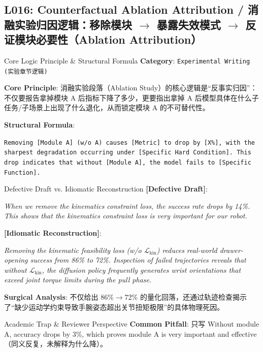 \subsection{L016: Counterfactual Ablation Attribution / 消融实验归因逻辑：移除模块 $\to$ 暴露失效模式 $\to$ 反证模块必要性（Ablation Attribution）}\label{sec:logic:L016}
\begin{ConceptBox}{Core Logic Principle \& Structural Formula}
\textbf{Category}: \texttt{Experimental Writing (实验章节逻辑)}\par\vspace{3pt}
\textbf{Core Principle}: 消融实验段落（Ablation Study）的核心逻辑是“反事实归因”：不仅要报告拿掉模块 A 后指标下降了多少，更要指出拿掉 A 后模型具体在什么子任务/子场景上出现了什么退化，从而锁定模块 A 的不可替代性。\par\vspace{4pt}
\textbf{Structural Formula}:\par\noindent\texttt{Removing [Module A] (w/o A) causes [Metric] to drop by [X\%], with the sharpest degradation occurring under [Specific Hard Condition]. This drop indicates that without [Module A], the model fails to [Specific Function].}
\end{ConceptBox}
\begin{ExampleBox}{Defective Draft vs. Idiomatic Reconstruction}
\textbf{\color{TargetHighlight}[Defective Draft]}:\par\textit{When we remove the kinematics constraint loss, the success rate drops by 14\%. This shows that the kinematics constraint loss is very important for our robot.}\par\vspace{4pt}
\textbf{\color{AcadNavy}[Idiomatic Reconstruction]}:\par\textit{Removing the kinematic feasibility loss (w/o $\mathcal{L}_{\text{kin}}$) reduces real-world drawer-opening success from 86\% to 72\%. Inspection of failed trajectories reveals that without $\mathcal{L}_{\text{kin}}$, the diffusion policy frequently generates wrist orientations that exceed joint torque limits during the pull phase.}\par\vspace{4pt}
\textbf{Surgical Analysis}: 不仅给出 86\%$\to$72\% 的量化回落，还通过轨迹检查揭示了“缺少运动学约束导致手腕姿态超出关节扭矩极限”的具体物理死因。
\end{ExampleBox}
\begin{TipBox}{Academic Trap \& Reviewer Perspective}
\textbf{Common Pitfall}: 只写 Without module A, accuracy drops by 3\%, which proves module A is very important and effective（同义反复，未解释为什么降）。
\end{TipBox}
\vspace{6pt}
